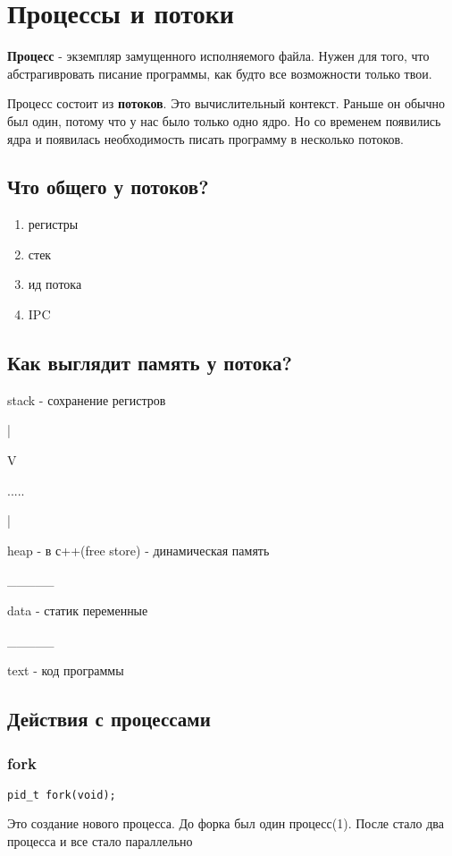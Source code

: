 \documentclass[12pt, a4paper]{scrartcl}
\begin{document}
	\section{Процессы и потоки}
		\textbf{Процесс} - экземпляр замущенного исполняемого файла. Нужен для того, что абстрагивровать писание программы, как будто все возможности только твои.
		
		
		Процесс состоит из \textbf{потоков}. Это вычислительный контекст. Раньше он обычно был один, потому что у нас было только одно ядро. Но со временем появились ядра и появилась необходимость писать программу в несколько потоков.
		
		\subsection{Что общего у потоков?}
			\begin{enumerate}
				\item регистры	
				\item стек
				\item ид потока
				\item IPC
			\end{enumerate}
		\subsection{Как выглядит память у потока?}
		stack - сохранение регистров\par
		| \par
		V \par
		..... \par
	 	|\par
		heap - в с++(free store) - динамическая память\par
		\_\_\_\_\_\par
		data - статик переменные\par
		\_\_\_\_\_\par
		text - код программы\par
		\subsection{Действия с процессами}
			\subsubsection{fork}
				\texttt{pid_t fork(void);} 
				
				Это создание нового процесса. До форка был один процесс(1). После стало два процесса и все стало параллельно 
				
\end{document}
